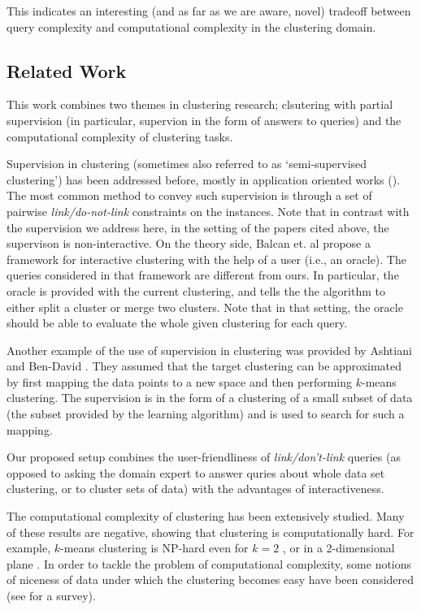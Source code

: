 \documentclass{article}
\begin{document}
This indicates an interesting (and as far as we are aware, novel) tradeoff between query complexity and computational complexity in the clustering domain. 


\subsection{Related Work}
This work combines two themes in clustering research; clsutering with partial supervision
(in particular, supervion in the form of answers to queries) and the computational complexity of clustering tasks.

Supervision in clustering (sometimes also referred to as `semi-supervised clustering') has been addressed before, mostly in application oriented works (\cite{basu2002semi,basu2004probabilistic, kulis2009semi}). The most common method to convey such supervision is through a set of pairwise \emph{link/do-not-link} constraints on the instances. Note that in contrast with the supervision we address here, in the setting of the papers cited above, the supervison is non-interactive. On the theory side, Balcan et. al \cite{balcan2008clustering} propose a framework for interactive clustering with the help of a user (i.e., an oracle). The queries considered in that framework are different from ours. In particular, the oracle is provided with the current clustering, and tells the the algorithm to either split a cluster or merge two clusters. Note that in that setting, the oracle should be able to evaluate the whole given clustering for each query.

Another example of the use of supervision in clustering was provided by Ashtiani and Ben-David \cite{ashtiani2015representation}. They assumed that the target clustering can be approximated by first mapping the data points to a new space and then performing $k$-means clustering. The supervision is in the form of a clustering of a small subset of data (the subset provided by the learning algorithm) and is used to search for such a mapping.

Our proposed setup combines the user-friendliness of \emph{link/don't-link} queries (as opposed to asking the domain expert to answer quries about whole data set clustering, or to cluster sets of data) with the advantages of interactiveness. 

The computational complexity of clustering has been extensively studied. Many of these results are negative, showing that clustering is computationally hard. For example, $k$-means clustering is NP-hard even for $k=2$ \cite{dasgupta2008hardness}, or in a 2-dimensional plane \cite{vattani2009hardness,mahajan2009planar}. In order to tackle the problem of computational complexity, some notions of niceness of data under which the clustering becomes easy have been considered (see \cite{Ben-David15} for a survey).
\end{document}
